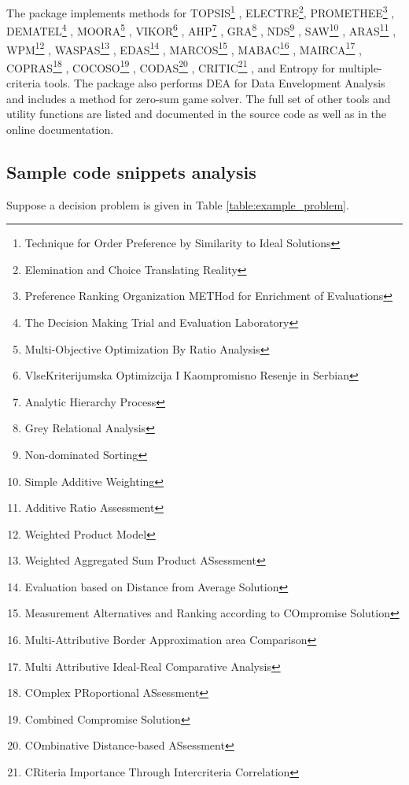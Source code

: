 \documentclass[preprint,review, 12pt, a4paper]{elsarticle}
\begin{document}
The package implements methods for 
TOPSIS\footnote{Technique for Order Preference by Similarity to Ideal Solutions} \cite{topsis}, 
ELECTRE\footnote{Elemination and Choice Translating Reality}\cite{electre}, 
PROMETHEE\footnote{Preference Ranking Organization METHod for Enrichment of Evaluations} \cite{promethee}, 
DEMATEL\footnote{The Decision Making Trial and Evaluation Laboratory} \cite{dematel}, 
MOORA\footnote{Multi-Objective Optimization By Ratio Analysis} \cite{moora}, 
VIKOR\footnote{VlseKriterijumska Optimizcija I Kaompromisno Resenje in Serbian} \cite{vikor_1, vikor_2}, 
AHP\footnote{Analytic Hierarchy Process} \cite{ahp}, 
GRA\footnote{Grey Relational Analysis} \cite{gra}, 
NDS\footnote{Non-dominated Sorting} \cite{Deb_2002}, 
SAW\footnote{Simple Additive Weighting} \cite{saw, wsm_wpm}, 
ARAS\footnote{Additive Ratio Assessment} \cite{aras}, 
WPM\footnote{Weighted Product Model} \cite{wsm_wpm}, 
WASPAS\footnote{Weighted Aggregated Sum Product ASsessment} \cite{waspas}, 
EDAS\footnote{Evaluation based on Distance from Average Solution} \cite{edas}, 
MARCOS\footnote{Measurement Alternatives and Ranking according to COmpromise Solution} \cite{marcos}, 
MABAC\footnote{Multi-Attributive Border Approximation area Comparison} \cite{mabac}, 
MAIRCA\footnote{Multi Attributive Ideal-Real Comparative Analysis} \cite{mairca}, 
COPRAS\footnote{COmplex PRoportional ASsessment} \cite{copras}, 
COCOSO\footnote{Combined Compromise Solution} \cite{cocoso},
CODAS\footnote{COmbinative Distance-based ASsessment} \cite{codas},
CRITIC\footnote{CRiteria Importance Through Intercriteria Correlation} \cite{critic},
and Entropy\cite{entropy} for multiple-criteria tools. 
The package also performs DEA for Data Envelopment Analysis \cite{dea} and includes a method for zero-sum game solver.  The full set of other tools and utility functions are listed and documented in the source code as well as in the online documentation.



\subsection{Sample code snippets analysis}
\label{section:sample_code}

Suppose a decision problem is given in Table \ref{table:example_problem}.
\end{document}
